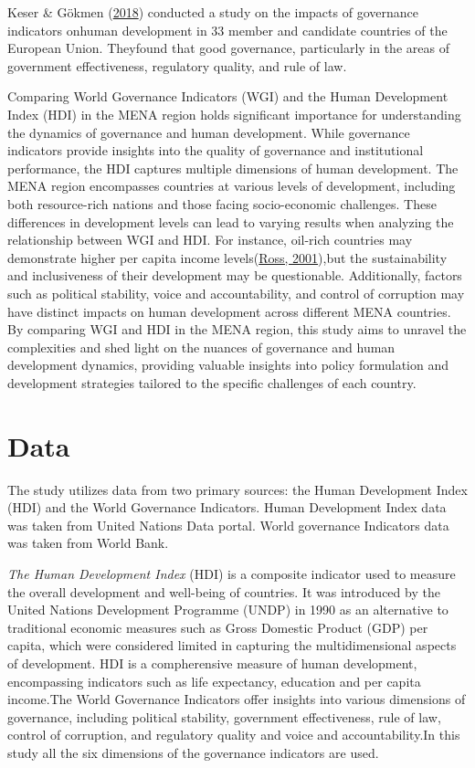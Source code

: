 \documentclass[
  12pt,
]{article}
\begin{document}
Keser \& Gökmen (\protect\hyperlink{ref-keser2018}{2018}) conducted a study on the impacts of governance indicators onhuman development in 33 member and candidate countries of the European Union. Theyfound that good governance, particularly in the areas of government effectiveness, regulatory
quality, and rule of law.

Comparing World Governance Indicators (WGI) and the Human Development Index (HDI) in the MENA region holds significant importance for understanding the dynamics of governance and human development. While governance indicators provide insights into the quality of governance and institutional performance, the HDI captures multiple dimensions of human development. The MENA region encompasses countries at various levels of development, including both resource-rich nations and those facing socio-economic challenges. These differences in development levels can lead to varying results when analyzing the relationship between WGI and HDI. For instance, oil-rich countries may demonstrate higher per capita income levels(\protect\hyperlink{ref-ross2001}{Ross, 2001}),but the sustainability and inclusiveness of their development may be questionable. Additionally, factors such as political stability, voice and accountability, and control of corruption may have distinct impacts on human development across different MENA countries. By comparing WGI and HDI in the MENA region, this study aims to unravel the complexities and shed light on the nuances of governance and human development dynamics, providing valuable insights into policy formulation and development strategies tailored to the specific challenges of each country.

\hypertarget{data}{%
\section{Data}\label{data}}

The study utilizes data from two primary sources: the Human Development
Index (HDI) and the World Governance Indicators. Human Development Index
data was taken from United Nations Data portal. World governance
Indicators data was taken from World Bank.

\emph{The Human Development Index} (HDI) is a composite indicator used to
measure the overall development and well-being of countries. It was
introduced by the United Nations Development Programme (UNDP) in 1990 as
an alternative to traditional economic measures such as Gross Domestic
Product (GDP) per capita, which were considered limited in capturing the
multidimensional aspects of development. HDI is a compherensive measure
of human development, encompassing indicators such as life expectancy,
education and per capita income.The World Governance Indicators offer insights into various dimensions of governance, including political stability, government effectiveness, rule of law, control of corruption, and regulatory quality and voice and accountability.In this study all the six dimensions of the governance indicators are used.
\end{document}
